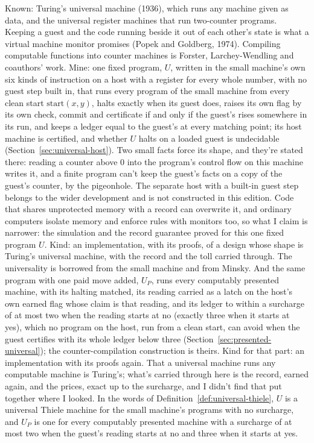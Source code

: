\documentclass[11pt,twoside]{article}
\theoremstyle{thielethm}
\theoremstyle{thieledef}
\theoremstyle{thieledef}
\theoremstyle{thieledef}
\theoremstyle{thielethm}
\theoremstyle{thieleobs}
\theoremstyle{thielethm}
\begin{document}
Known: Turing's universal machine (1936), which runs any machine given as data, and the
universal register machines that run two-counter programs. Keeping a guest and the code running
beside it out of each other's state is what a virtual machine monitor promises (Popek and
Goldberg, 1974). Compiling computable functions into counter machines is Forster, Larchey-Wendling and coauthors' work. Mine: one fixed program, $U$, written in the small machine's own six kinds of
instruction on a host with a register for every whole number, with no guest step built in, that
runs every program of the small machine from every clean start $\mathrm{start}(x, y)$, halts exactly when its guest does, raises
its own flag by its own check, commit and certificate if and only if the guest's rises somewhere in its run, and
keeps a ledger equal to the guest's at every matching point; its host machine is certified,
and whether $U$ halts on a loaded guest is undecidable (Section~\ref{sec:universal-host}). Two
small facts force its shape, and they're stated there: reading a counter above 0 into the program's control flow on this machine writes it, and a finite program can't keep the guest's facts on a copy of the guest's counter, by the
pigeonhole. The separate host with a built-in guest step belongs to the wider
development and is not constructed in this edition.
Code that shares unprotected memory with a record can overwrite it, and ordinary computers
isolate memory and enforce rules with monitors too, so what I claim is narrower: the simulation
and the record guarantee proved for this one fixed program $U$. Kind: an implementation, with its
proofs, of a design whose shape is Turing's universal
machine, with the record and the toll carried through. The universality is borrowed from the
small machine and from Minsky. And the same program with one paid move added, $U_P$, runs every
computably presented machine, with its halting matched, its reading carried as a latch on
the host's own earned flag whose claim is that reading, and its ledger to within a surcharge of
at most two when the reading starts at no (exactly three when it starts at yes), which no program on the host, run from a clean start, can avoid when the guest certifies with
its whole ledger below three (Section~\ref{sec:presented-universal});
the counter-compilation construction is theirs. Kind for that part:
an implementation with its proofs again. That a universal machine runs any computable machine is
Turing's; what's carried through here is the record, earned again, and the prices, exact up to
the surcharge, and I didn't find that put together where I looked. In the words of
Definition~\ref{def:universal-thiele}, $U$ is a universal Thiele machine for the small machine's
programs with no surcharge, and $U_P$ is one for every computably presented machine with a
surcharge of at most two when the guest's reading starts at no and three when it starts at yes.
\end{document}
